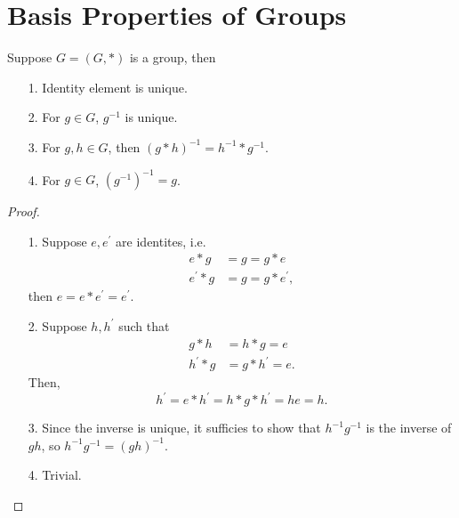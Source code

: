 \section{Basis Properties of Groups}
\begin{theorem}
    Suppose \(G = (G, *)\) is a group, then 
    \begin{itemize}
        \item [1.] Identity element is unique.
        \item [2.] For \(g \in G\), \(g^{-1} \) is unique. 
        \item [3.] For \(g, h \in G\), then \((g * h)^{-1} = h^{-1} * g^{-1}\).
        \item [4.] For \(g \in G\), \(\left( g^{-1}  \right)^{-1} = g\).    
    \end{itemize} 
\end{theorem}
\begin{proof}
    \vphantom{text}
    \begin{itemize}
        \item [1.] Suppose \(e, e^{\prime} \) are identites, i.e. 
        \begin{align*}
            e * g &= g = g * e \\
            e^{\prime} * g &= g = g * e^{\prime}, 
        \end{align*}
        then \(e = e * e^{\prime} = e^{\prime} \). 
        \item [2.] Suppose \(h, h^{\prime} \) such that
        \begin{align*}
            g * h &= h * g = e \\
            h^{\prime}  * g &= g * h^{\prime} = e.
        \end{align*}
        Then, 
        \[
            h^{\prime} = e * h^{\prime} = h * g * h^{\prime} = he = h.
        \]
        \item [3.] Since the inverse is unique, it sufficies to show that \(h^{-1} g^{-1}  \) is the inverse of \(gh\), so \(h^{-1} g^{-1} = (gh)^{-1}   \).   
        \item [4.] Trivial.
    \end{itemize}
\end{proof}
